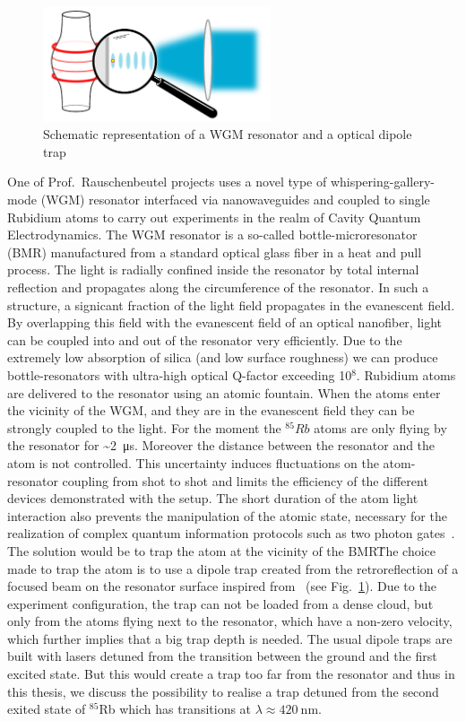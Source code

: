 \begin{figure}[hb]
    \centering
    \includegraphics[width=0.6\textwidth]{resonator_trap}
    \caption{\label{fig:resonator_trap} Schematic representation of a WGM 
    resonator and a optical dipole trap}
\end{figure}
One of Prof.\ Rauschenbeutel projects uses a novel type of whispering-gallery-mode (WGM)
resonator interfaced via nanowaveguides and coupled to single Rubidium atoms to 
carry out experiments in the realm of Cavity Quantum Electrodynamics. The WGM 
resonator is a so-called bottle-microresonator (BMR) manufactured from a standard 
optical glass fiber in a heat and pull process. The light is radially confined 
inside the resonator by total internal reflection and propagates along the 
circumference of the resonator. In such a structure, a signicant fraction of the 
light field propagates in the evanescent field. By overlapping this field with 
the evanescent field of an optical nanofiber, light can be coupled into and out 
of the resonator very efficiently. Due to the extremely low absorption of silica 
(and low surface roughness) we can produce bottle-resonators with ultra-high 
optical Q-factor exceeding 10\(^{8}\). Rubidium atoms are delivered to the 
resonator using an atomic fountain. When the atoms enter the vicinity of the WGM, 
and they are in the evanescent field they can be strongly coupled to the light. 
For the moment the \(^{85}Rb\) atoms are only flying by the resonator for 
\textasciitilde{}\SI{2}{\micro\second}. Moreover the distance between the 
resonator and the atom is not controlled. This uncertainty induces fluctuations
on the atom-resonator coupling from shot to shot and limits the efficiency of the
different devices demonstrated with the setup. The short duration of the atom
light interaction also prevents the manipulation of the atomic state, necessary
for the realization of complex quantum information protocols such as two photon
gates~\cite{PhysRevLett.92.127902}. The solution would be to trap the atom at the
vicinity of the BMR\. The choice made to trap the atom is to use a dipole trap 
created from the retroreflection of a focused beam on the resonator surface 
inspired from~\cite{Thompson1202} (see Fig.~\ref{fig:resonator_trap}). Due to the 
experiment configuration, the trap can not be loaded from a dense cloud, but only 
from the atoms flying next to the resonator, which have a non-zero velocity, which 
further implies that a big trap depth is needed. The usual dipole traps are built 
with lasers detuned from the transition between the ground and the first excited 
state. But this would create a trap too far from the resonator and thus in this 
thesis, we discuss the possibility to realise a trap detuned from the second exited 
state of \(^{85}\)Rb which has transitions at \(\lambda \approx \SI{420}{\nano\meter} \). 